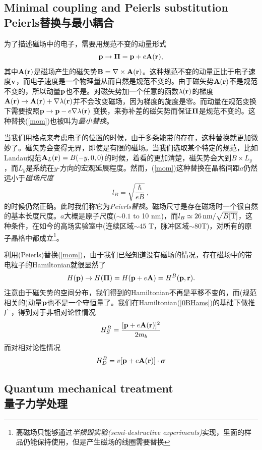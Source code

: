 \documentclass[10pt]{book}
\newcommand{\sigmab}{\mbox{\boldmath $\sigma $}}
\newcommand{\Pib}{\mbox{\boldmath $\Pi $}}
\newcommand{\bp}{{\bf p}}
\newcommand{\br}{{\bf r}}
\newcommand{\bA}{{\bf A}}
\newcommand{\bB}{{\bf B}}
\newcommand{\beq}{\begin{equation}}
\newcommand{\eeq}{\end{equation}}
\newcommand\itt{\it\color{blue}}
\begin{document}
\subsection[Peierls替换与最小耦合]{Minimal coupling and Peierls substitution\\\bf Peierls替换与最小耦合}


为了描述磁场中的电子，需要用规范不变的动量形式\cite{jackson}
\beq\label{mom}
\bp \to \Pib = \bp + e\bA(\br), %
\eeq
其中$\bA(\br)$是磁场产生的磁矢势$\bB=\nabla\times \bA(\br)$。这种规范不变的动量正比于电子速度${\bf v}$，而电子速度是一个物理量从而自然是规范不变的。由于磁矢势$\bA(\br)$不是规范不变的，所以动量$\bp$也不是。对磁矢势加一个任意的函数$\lambda(\br)$的梯度$\bA(\br)\to \bA(\br) + \nabla \lambda(\br)$并不会改变磁场，因为梯度的旋度是零。而动量在规范变换下需要按照$\bp\to \bp - e\nabla \lambda(\br)$ 变换，来弥补差的磁矢势而保证$\Pib$是规范不变的。这种替换(\ref{mom})也被叫为{\itt 最小替换}。

当我们用格点来考虑电子的位置的时候，由于多条能带的存在，这种替换就更加微妙了。磁矢势会变得无界，即使是有限的磁场。当我们选取某个特定的规范，比如Landau规范$\bA_L(\br)=B(-y,0,0)$的时候，着看的更加清楚，磁矢势会大到$B\times L_y$，而$L_y$是系统在$y$-方向的宏观延展程度。然而，(\ref{mom})这种替换在晶格间距$a$仍然远小于{\itt 磁场尺度}
\beq\label{lB}
l_B = \sqrt{\frac{\hbar}{eB}}\ ,
\eeq
的时候仍然正确。此时我们称它为{\itt Peierls替换}。磁场尺寸是存在磁场时一个很自然的基本长度尺度。$a$大概是原子尺度($\sim 0.1$ to 10 nm)，而$l_B\simeq 26\, {\rm nm}/\sqrt{B{\rm [T]}}$，这种条件，在如今的高场实验室中(连续区域$\sim 45$ T，脉冲区域$\sim 80$T)，对所有的原子晶格中都成立\footnote{高磁场只能够通过{\sl 半损毁实验(semi-destructive experiments)}实现，里面的样品仍能保持使用，但是产生磁场的线圈需要替换}。

利用(Peierls)替换(\ref{mom})，由于我们已经知道没有磁场的情况，存在磁场中的带电粒子的Hamiltonian就很显然了
\[H(\bp) \to H(\Pib)  = H(\bp + e\bA)= H^B(\bp,\br). \]
注意由于磁矢势的空间分布，我们得到的Hamiltonian不再是平移不变的，而(规范相关的)动量$\bp$也不是一个守恒量了。我们在Hamiltonian(\ref{0BHams})的基础下做推广，得到对于非相对论性情况
\beq\label{BHamS}
H_S^B = \frac{[\bp + e\bA(\br)]^2}{2m_b}
\eeq
而对相对论性情况
\beq\label{BHamD}
H_D^B = v[\bp +e \bA(\br)]\cdot \sigmab
\eeq

 
\subsection[量子力学处理]{Quantum mechanical treatment\\\bf 量子力学处理}
\end{document}
